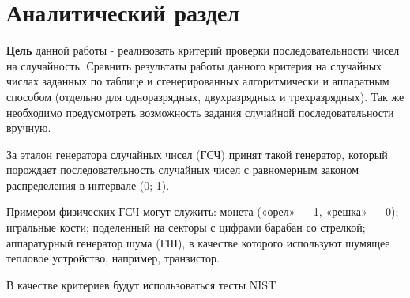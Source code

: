 \chapter{Аналитический раздел}

\textbf{Цель} данной работы - реализовать критерий проверки последовательности чисел на случайность. Сравнить результаты работы данного критерия на случайных числах заданных по таблице и сгенерированных алгоритмически и аппаратным способом (отдельно для одноразрядных, двухразрядных и трехразрядных). Так же необходимо предусмотреть возможность
задания случайной последовательности вручную.

За эталон генератора случайных чисел (ГСЧ) принят такой генератор, который порождает последовательность случайных чисел с равномерным законом распределения в интервале (0; 1). \cite{stratum-rand} 

Примером физических ГСЧ могут служить: монета («орел» — 1, «решка» — 0); игральные кости; поделенный на секторы с цифрами барабан со стрелкой; аппаратурный генератор шума (ГШ), в качестве которого используют шумящее тепловое устройство, например, транзистор. \cite{stratum-rand} 

В качестве критериев будут использоваться тесты NIST \cite{habrahabr-nist} 